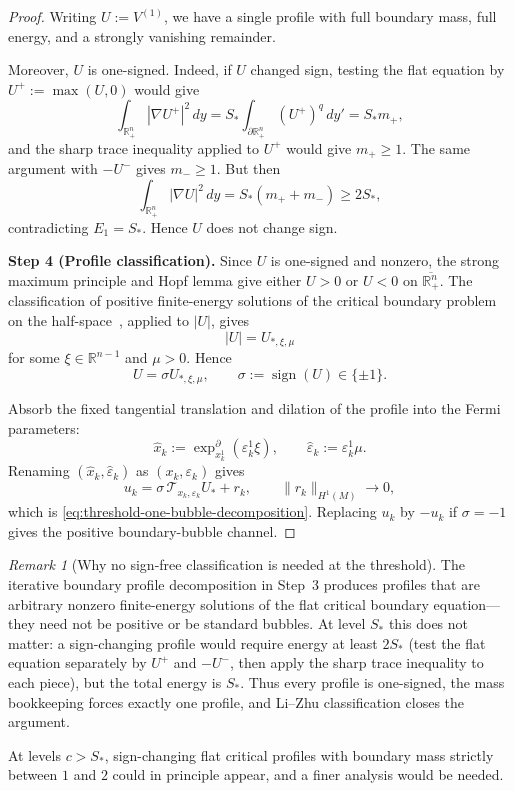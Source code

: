 \documentclass[11pt,reqno,a4paper]{amsart}
\newcommand{\R}{\mathbb{R}}
\numberwithin{equation}{section}
\theoremstyle{plain}
\theoremstyle{remark}
\newtheorem{remark}[theorem]{Remark}
\theoremstyle{plain}
\begin{document}
\begin{proof}
Writing $U:=V^{(1)}$, we have a single profile with full boundary mass, full
energy, and a strongly vanishing remainder.

Moreover, $U$ is one-signed.  Indeed, if $U$ changed sign, testing the flat
equation by $U^+:=\max(U,0)$ would give
\[
\int_{\R^n_+}|\nabla U^+|^2\,dy
=
S_\ast
\int_{\partial\R^n_+}(U^+)^q\,dy'
=
S_\ast m_+,
\]
and the sharp trace inequality applied to $U^+$ would give $m_+\ge1$.
The same argument with $-U^-$ gives $m_-\ge1$.  But then
\[
\int_{\R^n_+}|\nabla U|^2\,dy
=
S_\ast(m_++m_-)
\ge
2S_\ast,
\]
contradicting $E_1=S_\ast$.  Hence $U$ does not change sign.

\medskip\noindent
\textbf{Step 4 (Profile classification).}
Since $U$ is one-signed and nonzero, the strong maximum principle and Hopf
lemma give either $U>0$ or $U<0$ on $\overline{\R^n_+}$.  The classification
of positive finite-energy solutions of the critical boundary problem on the
half-space~\cite{LiZhu1995}, applied to $|U|$, gives
\[
|U|=U_{\ast,\xi,\mu}
\]
for some $\xi\in\R^{n-1}$ and $\mu>0$.  Hence
\[
U=\sigma U_{\ast,\xi,\mu},
\qquad
\sigma:=\operatorname{sign}(U)\in\{\pm1\}.
\]

Absorb the fixed tangential translation and dilation of the profile into the
Fermi parameters:
\[
\widehat x_k
:=
\exp_{x_k^1}^\partial(\varepsilon_k^1\xi),
\qquad
\widehat\varepsilon_k
:=
\varepsilon_k^1\mu .
\]
Renaming $(\widehat x_k,\widehat\varepsilon_k)$ as $(x_k,\varepsilon_k)$
gives
\[
u_k
=
\sigma\,\mathcal T_{x_k,\varepsilon_k}U_\ast
+
r_k,
\qquad
\|r_k\|_{H^1(M)}\to0,
\]
which is \eqref{eq:threshold-one-bubble-decomposition}.  Replacing $u_k$ by
$-u_k$ if $\sigma=-1$ gives the positive boundary-bubble channel.
\end{proof}

\begin{remark}[Why no sign-free classification is needed at the threshold]
\label{rem:no-generic-Struwe-needed-threshold}
The iterative boundary profile decomposition in Step~3 produces profiles that
are arbitrary nonzero finite-energy solutions of the flat critical boundary
equation---they need not be positive or be standard bubbles.  At level
$S_\ast$ this does not matter: a sign-changing profile would require energy at
least $2S_\ast$ (test the flat equation separately by $U^+$ and $-U^-$, then
apply the sharp trace inequality to each piece), but the total energy is
$S_\ast$.  Thus every profile is one-signed, the mass bookkeeping forces
exactly one profile, and Li--Zhu classification closes the argument.

At levels $c>S_\ast$, sign-changing flat critical profiles with boundary mass
strictly between $1$ and $2$ could in principle appear, and a finer analysis
would be needed.
\end{remark}
\end{document}
